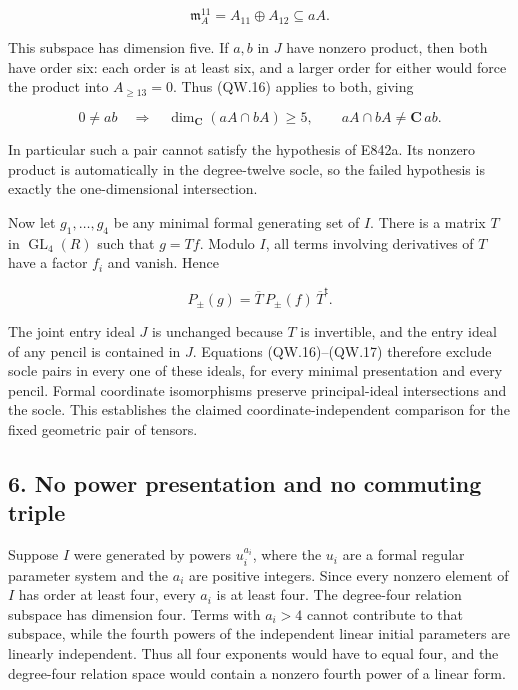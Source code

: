 \[
                  \mathfrak m_A^{11}=A_{11}\oplus A_{12}
                               \subseteq aA.
\tag{QW.16}
\]

This subspace has dimension five. If \(a,b\) in \(J\) have nonzero product,
then both have order six: each order is at least six, and a larger
order for either would force the product into \(A_{\ge13}=0\). Thus
(QW.16) applies to both, giving

\[
 0\ne ab\quad\Longrightarrow\quad
 \dim_{\mathbf C}(aA\cap bA)\ge5,
 \qquad aA\cap bA\ne\mathbf C\,ab.
\tag{QW.17}
\]

In particular such a pair cannot satisfy the hypothesis of E842a.
Its nonzero product is automatically in the degree-twelve socle,
so the failed hypothesis is exactly the one-dimensional intersection.

Now let \(g_1,\ldots,g_4\) be any minimal formal generating set of \(I\).
There is a matrix \(T\) in \(\operatorname{GL}_4(R)\) such that \(g=Tf\). Modulo \(I\), all terms
involving derivatives of \(T\) have a factor \(f_i\) and vanish. Hence

\[
       P_\pm(g)=\overline T\,P_\pm(f)\,\overline T^{\mathsf t}.
\tag{QW.18}
\]

The joint entry ideal \(J\) is unchanged because \(T\) is invertible, and
the entry ideal of any pencil is contained in \(J\). Equations
(QW.16)--(QW.17) therefore exclude socle pairs in every one of these
ideals, for every minimal presentation and every pencil. Formal
coordinate isomorphisms preserve principal-ideal intersections and
the socle. This establishes the claimed coordinate-independent
comparison for the fixed geometric pair of tensors.

\subsection{6. No power presentation and no commuting triple}\label{SF-E848W:s6}

Suppose \(I\) were generated by powers \(u_i^{a_i}\), where the \(u_i\) are a
formal regular parameter system and the \(a_i\) are positive integers.
Since every nonzero element of \(I\) has order at least four, every
\(a_i\) is at least four. The degree-four relation subspace has dimension
four. Terms with \(a_i>4\) cannot contribute to that subspace, while the
fourth powers of the independent linear initial parameters are
linearly independent. Thus all four exponents would have to equal
four, and the degree-four relation space would contain a nonzero
fourth power of a linear form.

